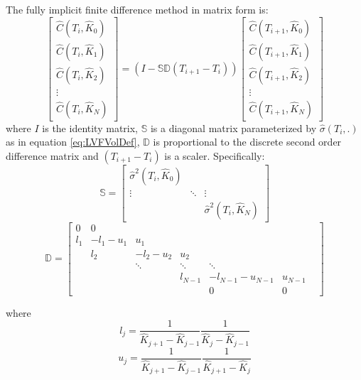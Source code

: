 \documentclass[letterpaper,12pt,titlepage,oneside,final]{book}
\numberwithin{equation}{section}
\theoremstyle{definition}
\begin{document}
The fully implicit finite difference method in matrix form is:
\begin{equation}
\begin{bmatrix}
\widehat{C}(T_{i},\widehat{K}_0)\\
\widehat{C}(T_{i},\widehat{K}_1)\\
\widehat{C}(T_{i},\widehat{K}_2)\\
\vdots\\
\widehat{C}(T_{i},\widehat{K}_{N})
\end{bmatrix}=(I-\mathcal{\mathbb{S}}\mathcal{\mathbb{D}}(T_{i+1}-T_i))
\begin{bmatrix}
\widehat{C}(T_{i+1},\widehat{K}_0)\\
\widehat{C}(T_{i+1},\widehat{K}_1)\\
\widehat{C}(T_{i+1},\widehat{K}_2)\\
\vdots\\
\widehat{C}(T_{i+1},\widehat{K}_{N})
\end{bmatrix}
\label{eq:LVFInt}
\end{equation}
where 
$I$ is the identity matrix, $\mathcal{\mathbb{S}}$ is a diagonal matrix parameterized by $\widehat{\sigma}(T_i,.)$ as in equation \eqref{eq:LVFVolDef},  $\mathcal{\mathbb{D}}$ is proportional to the discrete second order difference matrix and $(T_{i+1}-T_i)$ is a scaler. Specifically:
\begin{equation}
\mathcal{\mathbb{S}}=	\begin{bmatrix}
\widehat{\sigma}^2(T_i,\widehat{K}_{0})&&\\
\vdots&\ddots&\vdots\\
&&\widehat{\sigma}^2(T_i,\widehat{K}_{N})
\end{bmatrix}
\label{eq:LVFMatrixS}
\end{equation}
\begin{equation}
\mathcal{\mathbb{D}}=\begin{bmatrix}
0&0&&&&\\
l_1&-l_1-u_1&u_1&&&\\
&l_2&-l_2-u_2&u_2&&&\\
&&\ddots&\ddots&\ddots&&\\
&&&l_{N-1}&-l_{N-1}-u_{N-1}&u_{N-1}\\
&&&&0&0
\end{bmatrix}
\label{eq:LVFMatrixD}
\end{equation}

where 
\[l_j=\frac{1}{\widehat{K}_{j+1}-\widehat{K}_{j-1}}\frac{1}{\widehat{K}_{j}-\widehat{K}_{j-1}}\]
\[u_j=\frac{1}{\widehat{K}_{j+1}-\widehat{K}_{j-1}}\frac{1}{\widehat{K}_{j+1}-\widehat{K}_{j}}\]
\end{document}
